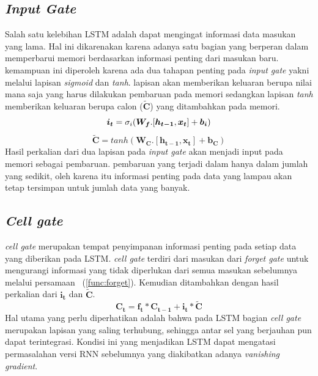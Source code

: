 \subsection{\textit{Input Gate}}
Salah satu kelebihan LSTM adalah dapat mengingat informasi data masukan yang lama. Hal ini dikarenakan karena adanya satu bagian yang berperan dalam memperbarui memori berdasarkan informasi penting dari masukan baru. kemampuan ini diperoleh karena ada dua tahapan penting pada \textit{input gate} yakni melalui lapisan \textit{sigmoid} dan \textit{tanh}. lapisan akan memberikan keluaran berupa nilai mana saja yang harus dilakukan pembaruan pada memori sedangkan lapisan \textit{tanh} memberikan keluaran berupa calon ($\boldsymbol{\tilde{C}}$) yang ditambahkan pada memori. 
\begin{equation}
	\boldsymbol{i_t} = \sigma_i(\boldsymbol{W_{f}}.[\boldsymbol{h_{t-1}}, \boldsymbol{x_t}] + \boldsymbol{b_i})\\
	\label{func:input}
\end{equation}
\begin{equation}
	\boldsymbol{\tilde{C}} = tanh(\boldsymbol{W_{C}}.[\boldsymbol{h_{t-1}}, \boldsymbol{x_t}] + \boldsymbol{b_C})
	\label{func:C-tilde}
\end{equation}
Hasil perkalian dari dua lapisan pada \textit{input gate} akan menjadi input pada memori sebagai pembaruan. pembaruan yang terjadi dalam hanya dalam jumlah yang sedikit, oleh karena itu informasi penting pada data yang lampau akan tetap tersimpan untuk jumlah data yang banyak.
\subsection{\textit{Cell gate}}
\textit{cell gate} merupakan tempat penyimpanan informasi penting pada setiap data yang diberikan pada LSTM. \textit{cell gate} terdiri dari masukan dari \textit{forget gate} untuk mengurangi informasi yang tidak diperlukan dari semua masukan sebelumnya melalui persamaan ~(\ref{func:forget}). Kemudian ditambahkan dengan hasil perkalian dari $\boldsymbol{i_t}$ dan $\boldsymbol{\tilde{C}}$.
\begin{equation}
	\boldsymbol{C_t} = \boldsymbol{f_t}*\boldsymbol{C_{t-1}} + \boldsymbol{i_t} * \boldsymbol{\tilde{C}}
	\label{func:cell_gate}
\end{equation}
Hal utama yang perlu diperhatikan adalah bahwa pada LSTM bagian \textit{cell gate} merupakan lapisan yang saling terhubung, sehingga antar sel yang berjauhan pun dapat terintegrasi. Kondisi ini yang menjadikan LSTM dapat mengatasi permasalahan versi RNN sebelumnya yang diakibatkan adanya \textit{vanishing gradient}.
